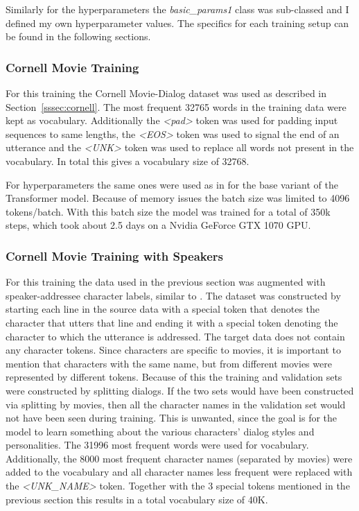 \documentclass[12pt]{article}
\begin{document}
Similarly for the hyperparameters the \textit{basic}\textit{\_}\textit{params1} class was sub-classed and I defined my own hyperparameter values. The specifics for each training setup can be found in the following sections.

\subsubsection{Cornell Movie Training} \label{sssec:cornell_training}
For this training the Cornell Movie-Dialog dataset was used as described in Section~\ref{sssec:cornell}. The most frequent 32765 words in the training data were kept as vocabulary. Additionally the \textit{\textless pad\textgreater} token was used for padding input sequences to same lengths, the \textit{\textless EOS\textgreater} token was used to signal the end of an utterance and the \textit{\textless UNK\textgreater} token was used to replace all words not present in the vocabulary. In total this gives a vocabulary size of 32768.

For hyperparameters the same ones were used as in \cite{Vaswani:2017} for the base variant of the Transformer model. Because of memory issues the batch size was limited to 4096 tokens/batch. With this batch size the model was trained for a total of 350k steps, which took about 2.5 days on a Nvidia GeForce GTX 1070 GPU.
\subsubsection{Cornell Movie Training with Speakers} \label{sssec:cornell_speakers}
For this training the data used in the previous section was augmented with speaker-addressee character labels, similar to \cite{Li:2016}. The dataset was constructed by starting each line in the source data with a special token that denotes the character that utters that line and ending it with a special token denoting the character to which the utterance is addressed. The target data does not contain any character tokens. Since characters are specific to movies, it is important to mention that characters with the same name, but from different movies were represented by different tokens. Because of this the training and validation sets were constructed by splitting dialogs. If the two sets would have been constructed via splitting by movies, then all the character names in the validation set would not have been seen during training. This is unwanted, since the goal is for the model to learn something about the various characters' dialog styles and personalities. The 31996 most frequent words were used for vocabulary. Additionally, the 8000 most frequent character names (separated by movies) were added to the vocabulary and all character names less frequent were replaced with the \textit{\textless UNK\_NAME\textgreater} token. Together with the 3 special tokens mentioned in the previous section this results in a total vocabulary size of 40K.
\end{document}
